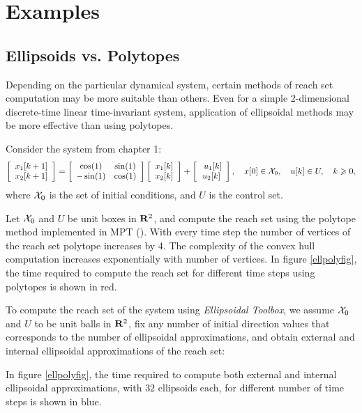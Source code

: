 \documentclass{report}
\newcommand{\XX}{{\cal X}}
\begin{document}
\chapter{Examples}
\section{Ellipsoids vs. Polytopes}
Depending on the particular dynamical system, certain methods of
reach set computation may be more suitable than others.
Even for a simple 2-dimensional discrete-time linear time-invariant
system, application of ellipsoidal methods may be more effective
than using polytopes.

Consider the system from chapter 1:
\[ \left[\begin{array}{c}
x_1[k+1]\\
x_2[k+1]\end{array}\right] = \left[\begin{array}{cc}
\cos(1) & \sin(1)\\
-\sin(1) & \cos(1)\end{array}\right]\left[\begin{array}{c}
x_1[k]\\
x_2[k]\end{array}\right] + \left[\begin{array}{c}\
u_1[k]\\
u_2[k]\end{array}\right], ~~~ x[0]\in\XX_0, ~~~ u[k]\in U, ~~~ k\geq0, \]
where $\XX_0$ is the set of initial conditions, and $U$ is the control set.

Let $\XX_0$ and $U$ be unit boxes in ${\bf R}^2$, and compute the reach set
using the polytope method implemented in MPT (\cite{mpt}). With every time step
the number of vertices of the reach set polytope increases by $4$.
The complexity of the
convex hull computation increases exponentially with number of vertices.
In figure \ref{ellpolyfig}, the time required to compute the reach set
for different time steps using polytopes is shown in red.

To compute the reach set of the system using {\it Ellipsoidal Toolbox},
we assume $\XX_0$ and $U$ to be unit balls in ${\bf R}^2$, fix any number
of initial direction values that corresponds to the number of ellipsoidal
approximations, and obtain external and internal ellipsoidal approximations
of the reach set:

In figure \ref{ellpolyfig}, the time required to compute both external
and internal ellipsoidal approximations, with $32$ ellipsoids each,
for different number of time steps is shown in blue.
\end{document}
